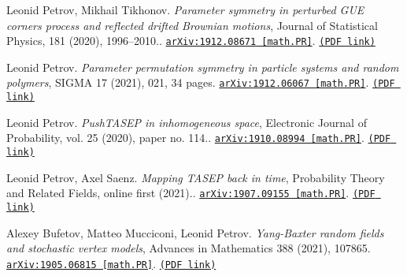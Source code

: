 \documentclass[letterpaper,11pt]{article}
\begin{document}
\begin{etaremune}
\item 
Leonid Petrov, Mikhail Tikhonov.
\emph{Parameter symmetry in perturbed GUE corners process and reflected drifted Brownian motions}, Journal of Statistical Physics, 181 (2020), 1996–2010.. 
\href{https://arxiv.org/abs/1912.08671}{\texttt{arXiv:1912.08671 [math.PR]}}. \href{https://storage.lpetrov.cc/research_files/Petrov-publ/pert_GUE_symm.pdf}{\texttt{(PDF link)}}



\item 
Leonid Petrov.
\emph{Parameter permutation symmetry in particle systems and random polymers}, SIGMA 17 (2021), 021, 34 pages. 
\href{https://arxiv.org/abs/1912.06067}{\texttt{arXiv:1912.06067 [math.PR]}}. \href{https://storage.lpetrov.cc/research_files/Petrov-publ/symm_IPS.pdf}{\texttt{(PDF link)}}



\item 
Leonid Petrov.
\emph{PushTASEP in inhomogeneous space}, Electronic Journal of Probability, vol. 25 (2020), paper no. 114.. 
\href{https://arxiv.org/abs/1910.08994}{\texttt{arXiv:1910.08994 [math.PR]}}. \href{https://storage.lpetrov.cc/research_files/Petrov-publ/33-publ-petrov-uva.pdf}{\texttt{(PDF link)}}









\item 
Leonid Petrov, Axel Saenz.
\emph{Mapping TASEP back in time}, Probability Theory and Related Fields, online first (2021).. 
\href{https://arxiv.org/abs/1907.09155}{\texttt{arXiv:1907.09155 [math.PR]}}. \href{https://storage.lpetrov.cc/research_files/Petrov-publ/backwards_TASEP_preprint.pdf}{\texttt{(PDF link)}}







\item 
Alexey Bufetov, Matteo Mucciconi, Leonid Petrov.
\emph{Yang-Baxter random fields and stochastic vertex models}, Advances in Mathematics 388 (2021), 107865. 
\href{https://arxiv.org/abs/1905.06815}{\texttt{arXiv:1905.06815 [math.PR]}}. \href{https://storage.lpetrov.cc/research_files/Petrov-publ/31-publ-petrov-uva.pdf}{\texttt{(PDF link)}}
















\end{etaremune}
\end{document}

